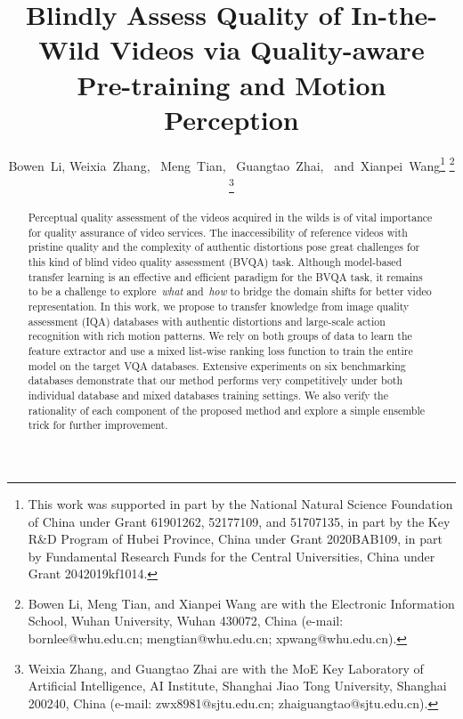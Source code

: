 \documentclass[journal]{IEEEtran}
\begin{document}
\title{Blindly Assess Quality of In-the-Wild Videos via Quality-aware Pre-training and Motion Perception}


\author{Bowen~Li,
        Weixia~Zhang,~
        Meng~Tian,~
        Guangtao~Zhai,~
        and~Xianpei~Wang\thanks{This work was supported in part by the National Natural Science Foundation of China under Grant 61901262, 52177109, and 51707135, in part by the Key R\&D Program of Hubei Province, China under Grant 2020BAB109, in part by Fundamental Research Funds for the Central Universities, China under Grant 2042019kf1014.}
\thanks{Bowen Li, Meng Tian, and Xianpei Wang are with the Electronic Information School, Wuhan University, Wuhan 430072, China (e-mail: bornlee@whu.edu.cn; mengtian@whu.edu.cn; xpwang@whu.edu.cn).}
\thanks{Weixia Zhang, and Guangtao Zhai are with the MoE Key Laboratory of Artificial Intelligence, AI Institute, Shanghai Jiao Tong University, Shanghai 200240, China (e-mail: zwx8981@sjtu.edu.cn; zhaiguangtao@sjtu.edu.cn).}
}


\maketitle

\begin{abstract}
Perceptual quality assessment of the videos acquired in the wilds is of vital importance for quality assurance of video services. The inaccessibility of reference videos with pristine quality and the complexity of authentic distortions pose great challenges for this kind of blind video quality assessment (BVQA) task. Although model-based transfer learning is an effective and efficient paradigm for the BVQA task, it remains to be a challenge to explore~\textit{what} and~\textit{how} to bridge the domain shifts for better video representation. In this work, we propose to transfer knowledge from image quality assessment (IQA) databases with authentic distortions and large-scale action recognition with rich motion patterns. We rely on both groups of data to learn the feature extractor and use a mixed list-wise ranking loss function to train the entire model on the target VQA databases. Extensive experiments on six benchmarking databases demonstrate that our method performs very competitively under both individual database and mixed databases training settings. We also verify the rationality of each component of the proposed method and explore a simple ensemble trick for further improvement.
\end{abstract}
\end{document}
